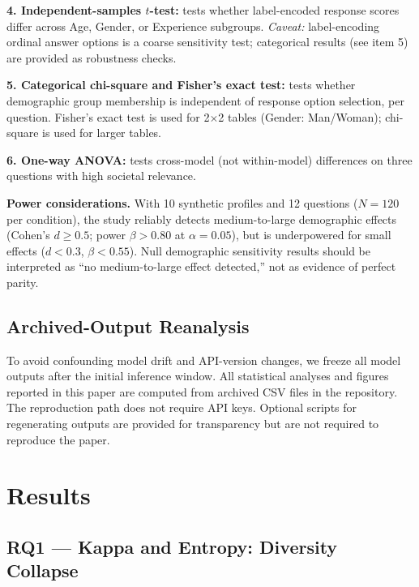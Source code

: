 \documentclass[12pt,a4paper]{article}
\begin{document}
\textbf{4. Independent-samples $t$-test:} tests whether label-encoded
response scores differ across Age, Gender, or Experience subgroups.
\textit{Caveat:} label-encoding ordinal answer options is a coarse
sensitivity test; categorical results (see item 5) are provided as
robustness checks.

\textbf{5. Categorical chi-square and Fisher's exact test:}
tests whether demographic group membership is independent of response
option selection, per question.
Fisher's exact test is used for 2$\times$2 tables (Gender: Man/Woman);
chi-square is used for larger tables.

\textbf{6. One-way ANOVA:} tests cross-model (not within-model)
differences on three questions with high societal relevance.

\textbf{Power considerations.}
With 10 synthetic profiles and 12 questions ($N{=}120$ per condition),
the study reliably detects medium-to-large demographic effects
(Cohen's $d \geq 0.5$; power $\beta > 0.80$ at $\alpha{=}0.05$),
but is underpowered for small effects ($d < 0.3$, $\beta < 0.55$).
Null demographic sensitivity results should be interpreted as
``no medium-to-large effect detected,'' not as evidence of perfect parity.

\subsection{Archived-Output Reanalysis}
\label{sec:method:archive}

To avoid confounding model drift and API-version changes, we freeze all
model outputs after the initial inference window.
All statistical analyses and figures reported in this paper are computed
from archived CSV files in the repository.
The reproduction path does not require API keys.
Optional scripts for regenerating outputs are provided for transparency
but are not required to reproduce the paper.

\section{Results}
\label{sec:results}

\subsection{RQ1 --- Kappa and Entropy: Diversity Collapse}
\label{sec:results:kappa}
\end{document}
